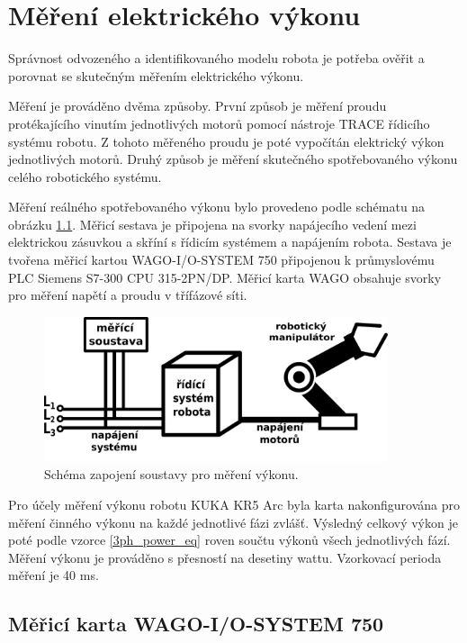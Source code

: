 \chapter{Měření elektrického výkonu}
\label{mereni_el_vykonu_sec}
Správnost odvozeného a identifikovaného modelu robota je potřeba ověřit a porovnat se skutečným měřením elektrického výkonu. 

Měření je prováděno dvěma způsoby. První způsob je měření proudu protékajícího vinutím jednotlivých motorů pomocí nástroje TRACE řídicího systému robotu. Z tohoto měřeného proudu je poté vypočítán elektrický výkon jednotlivých motorů. Druhý způsob je měření skutečného spotřebovaného výkonu celého robotického systému.    

Měření reálného spotřebovaného výkonu bylo provedeno podle schématu na obrázku \ref{schema_mereni_vykonu_pic}. Měřicí sestava je připojena na svorky napájecího vedení mezi elektrickou zásuvkou a skříní s řídicím systémem a napájením robota. Sestava je tvořena měřicí kartou WAGO-I/O-SYSTEM 750 připojenou k průmyslovému PLC Siemens S7-300 CPU 315-2PN/DP. Měřicí karta WAGO obsahuje svorky pro měření napětí a proudu v třífázové síti. 

\begin{figure}[ht]
\includegraphics[width=0.9\textwidth]{mereni_vykonu_obr}
\caption{Schéma zapojení soustavy pro měření výkonu.}
\label{schema_mereni_vykonu_pic}
\end{figure}

Pro účely měření výkonu robotu KUKA KR5 Arc byla karta nakonfigurována pro měření činného výkonu na každé jednotlivé fázi zvlášť. Výsledný celkový výkon je poté podle vzorce \eqref{3ph_power_eq} roven součtu výkonů všech jednotlivých fází. Měření výkonu je prováděno s přesností na desetiny wattu. Vzorkovací perioda měření je 40 ms. 

\section{Měřicí karta WAGO-I/O-SYSTEM 750}

